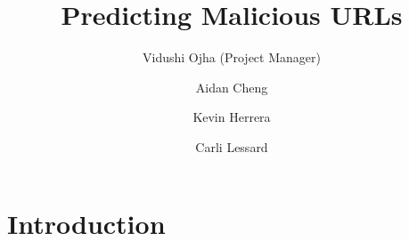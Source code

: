 \documentclass[cs,midyearupdate]{hmcclinic}
\title{Predicting Malicious URLs}
\author{Vidushi Ojha (Project Manager) \and Aidan Cheng \and Kevin Herrera \and Carli Lessard}
\begin{document}

\maketitle









\newpage


\section{Introduction}
\end{document}
